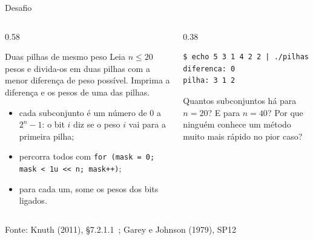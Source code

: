 \documentclass[aspectratio=169]{beamer}
\newcommand{\fonte}[1]{\vfill\hfill{\scriptsize\textcolor{UFSGray}{Fonte: #1}}}
\begin{document}
\begin{frame}[fragile]{Desafio}
  \vspace{-0.4em}
  \begin{columns}[T]
    \begin{column}{0.58\textwidth}
      \begin{block}{Duas pilhas de mesmo peso}
        \small Leia $n \leq 20$ pesos e divida-os em duas pilhas com a
        menor diferença de peso possível. Imprima a diferença e os pesos de
        uma das pilhas.
        \vspace{-0.3em}
        \begin{itemize}
          \item cada subconjunto é um número de 0 a $2^n - 1$: o bit $i$ diz
            se o peso $i$ vai para a primeira pilha;
          \item percorra todos com
            \texttt{for (mask = 0; mask < 1u <{}< n; mask++)};
          \item para cada um, some os pesos dos bits ligados.
        \end{itemize}
      \end{block}
    \end{column}
    \begin{column}{0.38\textwidth}
\begin{lstlisting}[style=shellStyle, language={}]
$ echo 5 3 1 4 2 2 | ./pilhas
diferenca: 0
pilha: 3 1 2
\end{lstlisting}
      \raggedright\small Quantos subconjuntos há para $n = 20$? E para
      $n = 40$? Por que ninguém conhece um método muito mais rápido no pior
      caso?
    \end{column}
  \end{columns}
  \fonte{Knuth (2011), §7.2.1.1~\cite{knuth2011art};
    Garey e Johnson (1979), SP12~\cite{garey1979computers}}
\end{frame}
\end{document}
